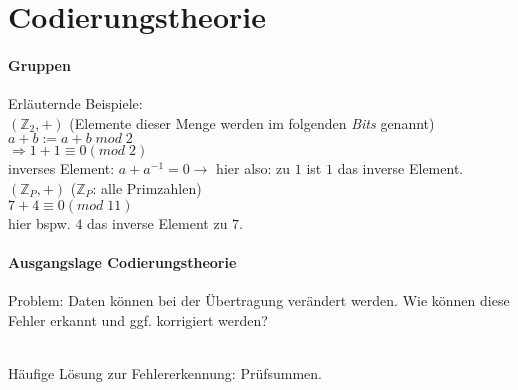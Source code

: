 \section{Codierungstheorie}

\paragraph{Gruppen}
Erläuternde Beispiele:\\
$(\mathbb{Z}_2,+)$ (Elemente dieser Menge werden im folgenden \emph{Bits} genannt)\\
$a+b:=a+b\; mod\; 2$\\
$\Rightarrow 1+1\equiv 0 (mod\; 2)$\\
inverses Element: $a+a^{-1}=0 \rightarrow$ hier also: zu $1$ ist $1$ das inverse Element.\medskip\\
$(\mathbb{Z}_P,+)$ ($\mathbb{Z}_P$: alle Primzahlen)\\
$7+4\equiv 0 (mod\; 11)$\\
hier bspw. $4$ das inverse Element zu $7$.

\paragraph{Ausgangslage Codierungstheorie}\parskp
Problem: Daten können bei der Übertragung verändert werden. Wie können diese Fehler erkannt und ggf. korrigiert werden?\\
\\
Häufige Lösung zur Fehlererkennung: Prüfsummen.
